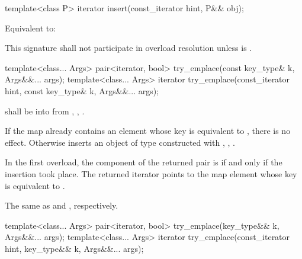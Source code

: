 %
\begin{itemdecl}
template<class P>
  iterator insert(const_iterator hint, P&& obj);
\end{itemdecl}

\begin{itemdescr}
\pnum
\effects Equivalent to:

\pnum
\remarks This signature shall not participate in overload resolution
unless  is .
\end{itemdescr}

%
\begin{itemdecl}
template<class... Args>
  pair<iterator, bool> try_emplace(const key_type& k, Args&&... args);
template<class... Args>
  iterator try_emplace(const_iterator hint, const key_type& k, Args&&... args);
\end{itemdecl}

\begin{itemdescr}
\pnum
\requires
{} shall be  into 
from , ,
.

\pnum
\effects
If the map already contains an element
whose key is equivalent to ,
there is no effect.
Otherwise inserts an object of type 
constructed with , ,
.

\pnum
\returns
In the first overload,
the  component of the returned pair is 
if and only if the insertion took place.
The returned iterator points to the map element
whose key is equivalent to .

\pnum
\complexity
The same as  and ,
respectively.
\end{itemdescr}

%
\begin{itemdecl}
template<class... Args>
  pair<iterator, bool> try_emplace(key_type&& k, Args&&... args);
template<class... Args>
  iterator try_emplace(const_iterator hint, key_type&& k, Args&&... args);
\end{itemdecl}

